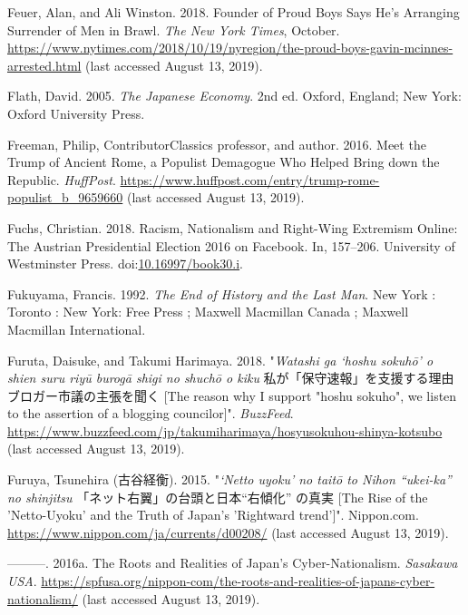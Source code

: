 \documentclass[10pt,british,A4paper,oneside]{memoir}
\begin{document}
\hypertarget{ref-feuer_founder_2018}{}
Feuer, Alan, and Ali Winston. 2018. Founder of Proud Boys Says He's
Arranging Surrender of Men in Brawl. \emph{The New York Times}, October.
\url{https://www.nytimes.com/2018/10/19/nyregion/the-proud-boys-gavin-mcinnes-arrested.html} (last accessed August 13, 2019).

\hypertarget{ref-flath_japanese_2005}{}
Flath, David. 2005. \emph{The Japanese Economy}. 2nd ed. Oxford,
England; New York: Oxford University Press.

\hypertarget{ref-freeman_meet_2016}{}
Freeman, Philip, ContributorClassics professor, and author. 2016. Meet
the Trump of Ancient Rome, a Populist Demagogue Who Helped Bring down
the Republic. \emph{HuffPost}.
\url{https://www.huffpost.com/entry/trump-rome-populist_b_9659660} (last accessed August 13, 2019).

\hypertarget{ref-fuchs_racism_2018}{}
Fuchs, Christian. 2018. Racism, Nationalism and Right-Wing Extremism
Online: The Austrian Presidential Election 2016 on Facebook. In,
157--206. University of Westminster Press.
doi:\href{https://doi.org/10.16997/book30.i}{10.16997/book30.i}.

\hypertarget{ref-fukuyama_end_1992}{}
Fukuyama, Francis. 1992. \emph{The End of History and the Last Man}. New
York : Toronto : New York: Free Press ; Maxwell Macmillan Canada ;
Maxwell Macmillan International.

\hypertarget{ref-furuta_eng:_2018}{}
Furuta, Daisuke, and Takumi Harimaya. 2018. "\emph{Watashi ga `hoshu sokuhō' o shien suru riyū burogā shigi no shuchō o kiku} 私が「保守速報」を支援する理由 ブロガー市議の主張を聞く [The reason why I support "hoshu sokuho", we listen to the assertion of a blogging councilor]". \emph{BuzzFeed}.
\url{https://www.buzzfeed.com/jp/takumiharimaya/hosyusokuhou-shinya-kotsubo} (last accessed August 13, 2019).

\hypertarget{ref-furuya_eng._2015}{}
Furuya, Tsunehira (古谷経衡). 2015. "\emph{`Netto uyoku' no taitō to Nihon “ukei-ka” no shinjitsu} 「ネット右翼」の台頭と日本“右傾化” の真実 [The Rise of the 'Netto-Uyoku' and the Truth of Japan's 'Rightward trend']". Nippon.com.
\url{https://www.nippon.com/ja/currents/d00208/} (last accessed August 13, 2019).

\hypertarget{ref-furuya_roots_2016}{}
---------. 2016a. The Roots and Realities of Japan's
Cyber-Nationalism. \emph{Sasakawa USA}.
\url{https://spfusa.org/nippon-com/the-roots-and-realities-of-japans-cyber-nationalism/} (last accessed August 13, 2019).
\end{document}
